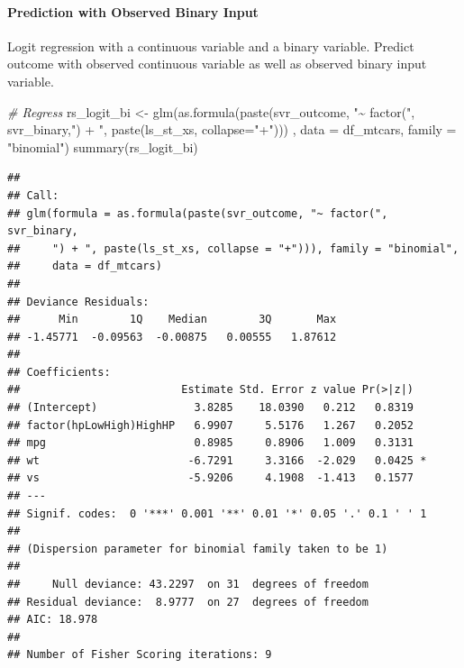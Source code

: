 \documentclass[
]{book}
\newenvironment{Shaded}{\begin{snugshade}}{\end{snugshade}}
\newcommand{\AttributeTok}[1]{\textcolor[rgb]{0.77,0.63,0.00}{#1}}
\newcommand{\CommentTok}[1]{\textcolor[rgb]{0.56,0.35,0.01}{\textit{#1}}}
\newcommand{\FunctionTok}[1]{\textcolor[rgb]{0.00,0.00,0.00}{#1}}
\newcommand{\NormalTok}[1]{#1}
\newcommand{\OtherTok}[1]{\textcolor[rgb]{0.56,0.35,0.01}{#1}}
\newcommand{\StringTok}[1]{\textcolor[rgb]{0.31,0.60,0.02}{#1}}
\begin{document}
\hypertarget{prediction-with-observed-binary-input}{%
\paragraph{Prediction with Observed Binary Input}\label{prediction-with-observed-binary-input}}

Logit regression with a continuous variable and a binary variable. Predict outcome with observed continuous variable as well as observed binary input variable.

\begin{Shaded}
\begin{Highlighting}[]
\CommentTok{\# Regress}
\NormalTok{rs\_logit\_bi }\OtherTok{\textless{}{-}} \FunctionTok{glm}\NormalTok{(}\FunctionTok{as.formula}\NormalTok{(}\FunctionTok{paste}\NormalTok{(svr\_outcome,}
                                    \StringTok{"\textasciitilde{} factor("}\NormalTok{, svr\_binary,}\StringTok{") + "}\NormalTok{,}
                                    \FunctionTok{paste}\NormalTok{(ls\_st\_xs, }\AttributeTok{collapse=}\StringTok{"+"}\NormalTok{)))}
\NormalTok{                   , }\AttributeTok{data =}\NormalTok{ df\_mtcars, }\AttributeTok{family =} \StringTok{"binomial"}\NormalTok{)}
\FunctionTok{summary}\NormalTok{(rs\_logit\_bi)}
\end{Highlighting}
\end{Shaded}

\begin{verbatim}
## 
## Call:
## glm(formula = as.formula(paste(svr_outcome, "~ factor(", svr_binary, 
##     ") + ", paste(ls_st_xs, collapse = "+"))), family = "binomial", 
##     data = df_mtcars)
## 
## Deviance Residuals: 
##      Min        1Q    Median        3Q       Max  
## -1.45771  -0.09563  -0.00875   0.00555   1.87612  
## 
## Coefficients:
##                         Estimate Std. Error z value Pr(>|z|)  
## (Intercept)               3.8285    18.0390   0.212   0.8319  
## factor(hpLowHigh)HighHP   6.9907     5.5176   1.267   0.2052  
## mpg                       0.8985     0.8906   1.009   0.3131  
## wt                       -6.7291     3.3166  -2.029   0.0425 *
## vs                       -5.9206     4.1908  -1.413   0.1577  
## ---
## Signif. codes:  0 '***' 0.001 '**' 0.01 '*' 0.05 '.' 0.1 ' ' 1
## 
## (Dispersion parameter for binomial family taken to be 1)
## 
##     Null deviance: 43.2297  on 31  degrees of freedom
## Residual deviance:  8.9777  on 27  degrees of freedom
## AIC: 18.978
## 
## Number of Fisher Scoring iterations: 9
\end{verbatim}
\end{document}
